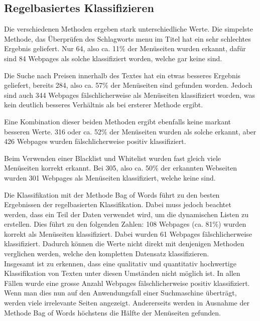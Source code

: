 \subsection{Regelbasiertes Klassifizieren}
Die verschiedenen Methoden ergeben stark unterschiedliche Werte.
Die simpelste Methode, das Überprüfen des Schlagworts \glqq menu\grqq{} im Titel hat ein sehr schlechtes Ergebnis geliefert. 
Nur 64, also ca. 11\% der Menüseiten wurden erkannt, dafür sind 84 Webpages als solche klassifiziert worden, welche gar keine sind.

Die Suche nach Preisen innerhalb des Textes hat ein etwas besseres Ergebnis geliefert, bereits 284, also ca. 57\% der Menüseiten sind gefunden worden. 
Jedoch sind auch 344 Webpages fälschlicherweise als Menüseiten klassifiziert worden, was kein deutlich besseres Verhältnis als bei ersterer Methode ergibt.

Eine Kombination dieser beiden Methoden ergibt ebenfalls keine markant besseren Werte.
316 oder ca. 52\% der Menüseiten wurden als solche erkannt, aber 426 Webpages wurden fälschlicherweise positiv klassifiziert.

Beim Verwenden einer Blacklist und Whitelist wurden fast gleich viele Menüseiten korrekt erkannt. Bei 305, also ca. 50\% der erkannten Webseiten wurden 301  Webpages als Menüseiten klassifiziert, welche keine sind.

Die Klassifikation mit der Methode \glqq Bag of Words\grqq{} führt zu den besten Ergebnissen der regelbasierten Klassifikation.
Dabei muss jedoch beachtet werden, dass ein Teil der Daten verwendet wird, um die dynamischen Listen zu erstellen.
Dies führt zu den folgenden Zahlen: 108 Webpages (ca. 81\%) wurden korrekt als Menüseiten klassifiziert.
Dabei wurden 61 Webpages fälschlicherweise klassifiziert.
Dadurch können die Werte nicht direkt mit denjenigen Methoden verglichen werden, welche den kompletten Datensatz klassifizieren. \\

Insgesamt ist zu erkennen, dass eine qualitativ und quantitativ hochwertige Klassifikation von Texten unter diesen Umständen nicht möglich ist.
In allen Fällen wurde eine grosse Anzahl Webpages fälschlicherweise positiv klassifiziert.
Wenn man dies nun auf den Anwendungsfall einer Suchmaschine überträgt, werden viele irrelevante Seiten angezeigt.
Andererseits werden in Ausnahme der Methode \glqq Bag of Words\grqq{} höchstens die Hälfte der Menüseiten gefunden.
